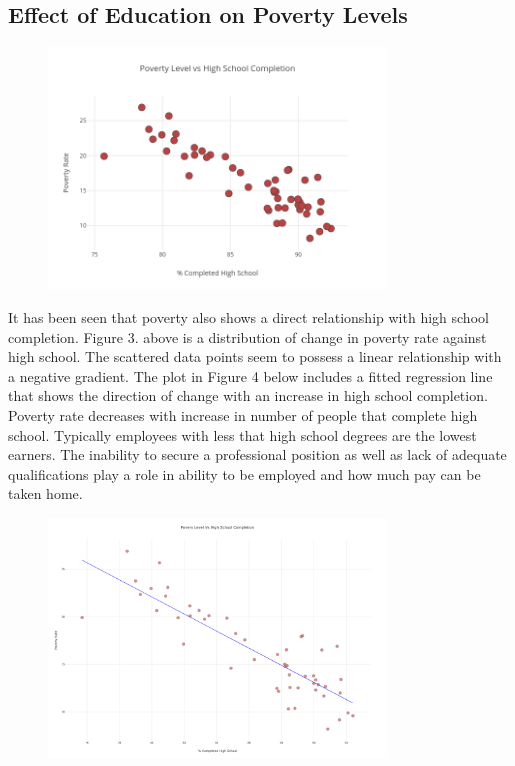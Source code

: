 \documentclass[a4paper,12pt]{article}
\begin{document}
\subsection{Effect of Education on Poverty Levels}
\begin{figure}[hbt!]
    \centering
    \includegraphics[width=0.8\textwidth]{poverty_vs_high_school.png}
    \caption{}
\end{figure}
\FloatBarrier
It has been seen that poverty also shows a direct relationship with high school completion. Figure 3. above is a distribution of change in poverty rate against high school. The scattered data points seem to possess a linear relationship with a negative gradient. The plot in Figure 4 below includes a fitted regression line that shows the direction of change with an increase in high school completion. Poverty rate decreases with increase in number of people that complete high school. Typically employees with less that high school degrees are the lowest earners. The inability to secure a professional position as well as lack of adequate qualifications play a role in ability to be employed and how much pay can be taken home. 
\begin{figure}[hbt!]
    \centering
    \includegraphics[width=0.8\textwidth]{plot_from_API.png}
    \caption{}
\end{figure}
\FloatBarrier
\end{document}
